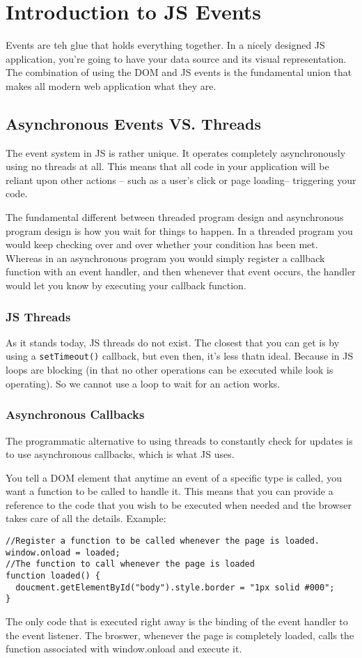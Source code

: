 \documentclass[a4paper,11pt]{book}
\begin{document}
\section{Introduction to JS Events}
Events are teh glue that holds everything together. In a nicely designed JS
application, you're going to have your data source and its visual
representation. The combination of using the DOM and JS events is the
fundamental union that makes all modern web application what they are.

\subsection{Asynchronous Events VS. Threads}
The event system in JS is rather unique. It operates completely asynchronously
using no threads at all. This means that all code in your application will be
reliant upon other actions -- such as a user's click or page loading--
triggering your code.

The fundamental different between threaded program design and asynchronous
program design is how you wait for things to happen. In a threaded program you
would keep checking over and over whether your condition has been met. Whereas
in an asynchronous program you would simply register a callback function with an
event handler, and then whenever that event occurs, the handler would let you
know by executing your callback function. 

\subsubsection{JS Threads}
As it stands today, JS threads do not exist. The closest that you can get is by
using a \verb|setTimeout()| callback, but even then, it's less thatn ideal.
Because in JS loops are blocking (in that no other operations can be executed
while look is operating). So we cannot use a loop to wait for an action works.

\subsubsection{Asynchronous Callbacks}
The programmatic alternative to using threads to constantly check for updates is
to use asynchronous callbacks, which is what JS uses.

You tell a DOM element that anytime an event of a specific type is called, you
want a function to be called to handle it. This means that you can provide a
reference to the code that you wish to be executed when needed and the browser
takes care of all the details. Example:
\begin{verbatim}
//Register a function to be called whenever the page is loaded.
window.onload = loaded;
//The function to call whenever the page is loaded
function loaded() {
  doucment.getElementById("body").style.border = "1px solid #000";
}
\end{verbatim}
The only code that is executed right away is the binding of the event handler to
the event listener. The broswer, whenever the page is completely loaded, calls
the function associated with window.onload and execute it.
\end{document}
